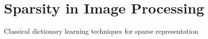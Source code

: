 \section{Sparsity in Image Processing}
Classical dictionary learning techniques for sparse representation